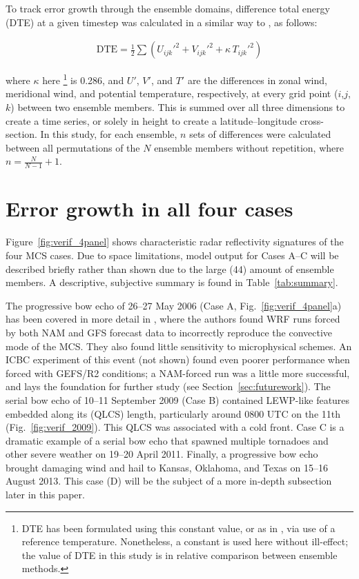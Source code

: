 \documentclass{ametsoc}
\def\gefs{\mbox{GEFS/R2}} %
\begin{document}
To track error growth through the ensemble domains, difference total energy (DTE) at a given timestep was calculated in a similar way to \citet{Tan2004-ss}, as follows:

\begin{align}
\textrm{DTE} = \frac{1}{2} \sum (U_{ijk}'^2 + V_{ijk}'^2 + \kappa \, T_{ijk}'^2) 
\end{align}

\noindent where $\kappa$ here \footnote{DTE has been formulated using this constant value, or as in \citet{Tan2004-ss}, via use of a reference temperature. Nonetheless, a constant is used here without ill-effect; the value of DTE in this study is in relative comparison between ensemble methods.} is 0.286, and $U'$, $V'$, and $T'$ are the differences in zonal wind, meridional wind, and potential temperature, respectively, at every grid point ($i$,$j$,$k$) between two ensemble members. This is summed over all three dimensions to create a time series, or solely in height to create a latitude--longitude cross-section. In this study, for each ensemble, $n$ sets of differences were calculated between all permutations of the $N$ ensemble members without repetition, where $n = \frac{N}{N-1} + 1$. 

\section{Error growth in all four cases}

Figure~\ref{fig:verif_4panel} shows characteristic radar reflectivity signatures of the four MCS cases. Due to space limitations, model output for Cases A--C will be described briefly rather than shown due to the large (44) amount of ensemble members. A descriptive, subjective summary is found in Table~\ref{tab:summary}.

The progressive bow echo of 26--27 May 2006 (Case A, Fig.~\ref{fig:verif_4panel}a) has been covered in more detail in \citet{Snively2014-pr}, where the authors found WRF runs forced by both NAM and GFS forecast data to incorrectly reproduce the convective mode of the MCS. They also found little sensitivity to microphysical schemes. An ICBC experiment of this event (not shown) found even poorer performance when forced with \gefs{} conditions; a NAM-forced run was a little more successful, and lays the foundation for further study (see Section~\ref{sec:futurework}). The serial bow echo of 10--11 September 2009 (Case B) contained LEWP-like features embedded along its (QLCS) length, particularly around 0800 UTC on the 11th (Fig.~\ref{fig:verif_2009}). This QLCS was associated with a cold front. Case C is a dramatic example of a serial bow echo that spawned multiple tornadoes and other severe weather on 19--20 April 2011. Finally, a progressive bow echo brought damaging wind and hail to Kansas, Oklahoma, and Texas on 15--16 August 2013. This case (D) will be the subject of a more in-depth subsection later in this paper.
\end{document}
